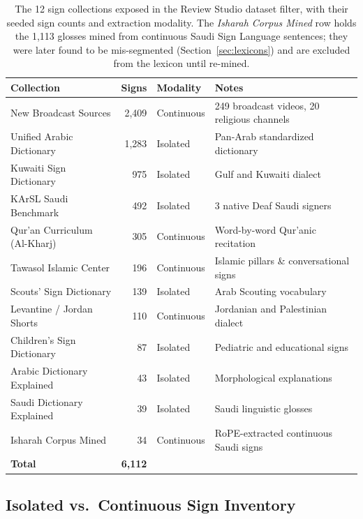 \begin{table}[ht]
\centering\small
\caption{The 12 sign collections exposed in the Review Studio dataset filter, with their seeded
sign counts and extraction modality.  The \emph{Isharah Corpus Mined} row holds the 1,113
glosses mined from continuous Saudi Sign Language sentences; they were later found to be mis-segmented (Section~\ref{sec:lexicons})
and are excluded from the lexicon until re-mined.}
\label{tab:review_collections}
\begin{tabularx}{\textwidth}{L{4.6cm} r L{2.4cm} Y}
\toprule
Collection & Signs & Modality & Notes \\
\midrule
New Broadcast Sources & 2,409 & Continuous & 249 broadcast videos, 20 religious channels \\
Unified Arabic Dictionary & 1,283 & Isolated & Pan-Arab standardized dictionary \\
Kuwaiti Sign Dictionary & 975 & Isolated & Gulf and Kuwaiti dialect \\
KArSL Saudi Benchmark & 492 & Isolated & 3 native Deaf Saudi signers \\
Qur'an Curriculum (Al-Kharj) & 305 & Continuous & Word-by-word Qur'anic recitation \\
Tawasol Islamic Center & 196 & Continuous & Islamic pillars \& conversational signs \\
Scouts' Sign Dictionary & 139 & Isolated & Arab Scouting vocabulary \\
Levantine / Jordan Shorts & 110 & Continuous & Jordanian and Palestinian dialect \\
Children's Sign Dictionary & 87 & Isolated & Pediatric and educational signs \\
Arabic Dictionary Explained & 43 & Isolated & Morphological explanations \\
Saudi Dictionary Explained & 39 & Isolated & Saudi linguistic glosses \\
Isharah Corpus Mined & 34 & Continuous & RoPE-extracted continuous Saudi signs \\
\midrule
\textbf{Total} & \textbf{6,112} & & \\
\bottomrule
\end{tabularx}
\end{table}

\subsection{Isolated vs.\ Continuous Sign Inventory}

